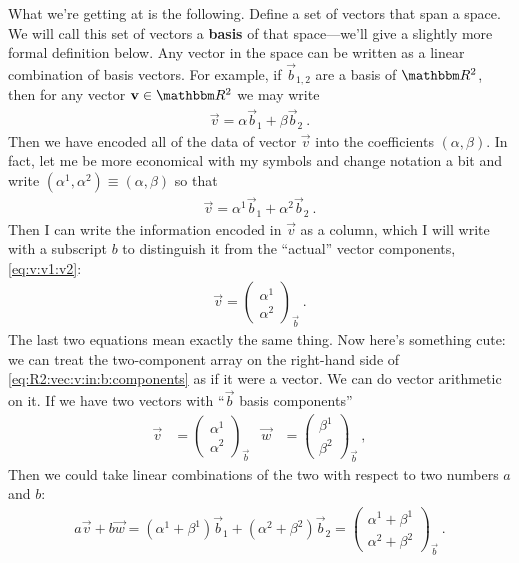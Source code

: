 What we're getting at is the following.  Define a set of vectors that span a space. We will call this set of vectors a \textbf{basis} of that space---we'll give a slightly more formal definition below. Any vector in the space can be written as a linear combination of basis vectors. For example, if $\vec{b}_{1,2}$ are a basis of $\RR ^2$, then for any vector $\vec{v}\in\RR ^2$ we may write
\begin{align}
    \vec{v} = \alpha \vec{b}_{1} + \beta \vec{b}_2 \ .
\end{align}
Then we have encoded all of the data of vector $\vec{v}$ into the coefficients $(\alpha, \beta)$. In fact, let me be more economical with my symbols and change notation a bit and write $(\alpha^1, \alpha^2) \equiv (\alpha,\beta)$ so that
\begin{align}
    \vec{v} = \alpha^1 \vec{b}_{1} + \alpha^2 \vec{b}_2 \ .
    \label{eq:R2:vec:v:in:b:components:lincomb}
\end{align}
Then I can write the information encoded in $\vec{v}$ as a column, which I will write with a subscript $b$ to distinguish it from the ``actual'' vector components, \eqref{eq:v:v1:v2}:
\begin{align}
    \vec{v} = 
    \begin{pmatrix}
        \alpha^1\\
        \alpha^2
    \end{pmatrix}_{\vec{b}} \ .
    \label{eq:R2:vec:v:in:b:components}
\end{align}
The last two equations mean exactly the same thing. Now here's something cute: we can treat the two-component array on the right-hand side of \eqref{eq:R2:vec:v:in:b:components} as if it were a vector. We can do vector arithmetic on it. If we have two vectors with ``$\vec{b}$ basis components''
\begin{align}
    \vec{v}&=
    \begin{pmatrix}
        \alpha^1\\
        \alpha^2
    \end{pmatrix}_{\vec{b}} 
    &
    \vec{w}&=
    \begin{pmatrix}
        \beta^1\\
        \beta^2
    \end{pmatrix}_{\vec{b}}  \ ,
\end{align}
Then we could take linear combinations of the two with respect to two numbers $a$ and $b$:
\begin{align}
    a\vec{v} + b\vec{w} =
    (\alpha^1+\beta^1) \vec{b}_{1} + (\alpha^2+\beta^2) \vec{b}_2
    =
    \begin{pmatrix}
        \alpha^1 + \beta^1 \\
        \alpha^2 + \beta^2
    \end{pmatrix}_{\vec{b}} \ .
    \label{eq:linear:combination:in:b:basis}
\end{align}

